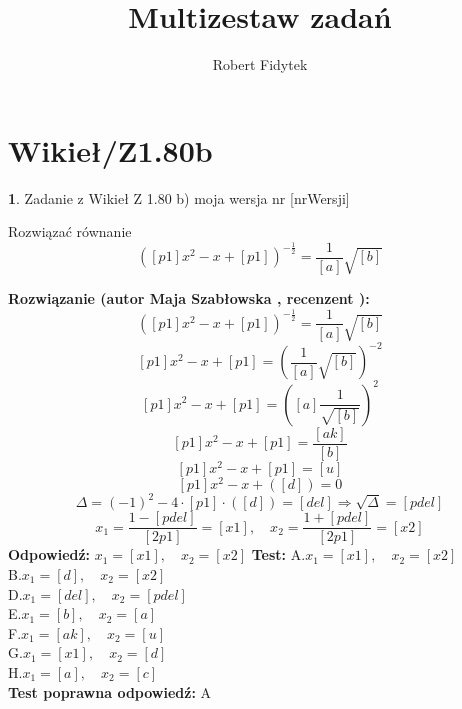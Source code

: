 \documentclass[12pt, a4paper]{article}
\title{Multizestaw zadań}
\author{Robert Fidytek}
\date{}
\theoremstyle{definition} %
\newtheorem{zad}{}
\newcommand{\kategoria}[1]{\section{#1}} %
\newcommand{\zadStart}[1]{\begin{zad}#1\newline} %
\newcommand{\zadStop}{\end{zad}}   %
\newcommand{\rozwStart}[2]{\noindent \textbf{Rozwiązanie (autor #1 , recenzent #2): }\newline} %
\newcommand{\rozwStop}{\newline}                                            %
\newcommand{\odpStart}{\noindent \textbf{Odpowiedź:}\newline}    %
\newcommand{\odpStop}{\newline}                                             %
\newcommand{\testStart}{\noindent \textbf{Test:}\newline} %
\newcommand{\testStop}{\newline} %
\newcommand{\kluczStart}{\noindent \textbf{Test poprawna odpowiedź:}\newline} %
\newcommand{\kluczStop}{\newline} %
\begin{document}
\maketitle


\kategoria{Wikieł/Z1.80b}
\zadStart{Zadanie z Wikieł Z 1.80 b)  moja wersja nr [nrWersji]}



Rozwiązać równanie 
$$([p1]x^{2}-x+[p1])^{-\frac{1}{2}}=\frac{1}{[a]}\sqrt{[b]}$$
\zadStop

\rozwStart{Maja Szabłowska}{}
$$([p1]x^{2}-x+[p1])^{-\frac{1}{2}}=\frac{1}{[a]}\sqrt{[b]}$$
$$[p1]x^{2}-x+[p1]=\left(\frac{1}{[a]}\sqrt{[b]}\right)^{-2}$$
$$[p1]x^{2}-x+[p1]=\left([a]\frac{1}{\sqrt{[b]}}\right)^{2}$$
$$[p1]x^{2}-x+[p1]=\frac{[ak]}{[b]}$$
$$[p1]x^{2}-x+[p1]=[u]$$
$$[p1]x^{2}-x+([d])=0$$
$$\Delta=(-1)^2 - 4\cdot[p1]\cdot([d])=[del]\Rightarrow \sqrt{\Delta}=[pdel]$$
$$x_{1}=\frac{1-[pdel]}{[2p1]}=[x1], \quad x_{2}=\frac{1+[pdel]}{[2p1]}=[x2]$$
\rozwStop
\odpStart
$x_{1}=[x1], \quad x_{2}=[x2]$
\odpStop
\testStart
A.$x_{1}=[x1], \quad x_{2}=[x2]$\\
B.$x_{1}=[d], \quad x_{2}=[x2]$\\
D.$x_{1}=[del], \quad x_{2}=[pdel]$\\
E.$x_{1}=[b], \quad x_{2}=[a]$\\
F.$x_{1}=[ak], \quad x_{2}=[u]$\\
G.$x_{1}=[x1], \quad x_{2}=[d]$\\
H.$x_{1}=[a], \quad x_{2}=[c]$\\
\testStop
\kluczStart
A
\kluczStop
\end{document}
